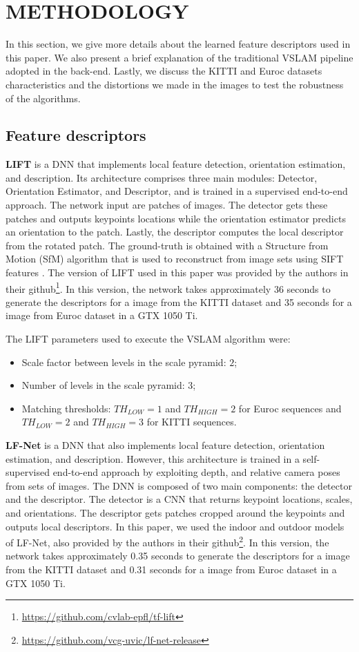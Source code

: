 \documentclass[a4paper, 10pt, conference]{ieeeconf}      %
\begin{document}
\section{METHODOLOGY}
In this section, we give more details about the learned feature descriptors used in this paper. We also present a brief explanation of the traditional VSLAM pipeline adopted in the back-end. Lastly, we discuss the KITTI and Euroc datasets characteristics and the distortions we made in the images to test the robustness of the algorithms. 

\subsection{Feature descriptors}
\textbf{LIFT} \cite{lift} is a DNN that implements local feature detection, orientation estimation, and description. Its architecture comprises three main modules: Detector, Orientation Estimator, and Descriptor, and is trained in a supervised end-to-end approach. The network input are patches of images. The detector gets these patches and outputs keypoints locations while the orientation estimator predicts an orientation to the patch. Lastly, the descriptor computes the local descriptor from the rotated patch. The ground-truth is obtained with a Structure from Motion (SfM) algorithm that is used to reconstruct from image sets using SIFT features \cite{sift}. The version of LIFT used in this paper was provided by the authors in their github\footnote{\url{https://github.com/cvlab-epfl/tf-lift}}. In this version, the network takes approximately 36 seconds to generate the descriptors for a image from the KITTI dataset and 35 seconds for a image from Euroc dataset in a GTX 1050 Ti.

The LIFT parameters used to execute the VSLAM algorithm were: 
\begin{itemize}
    \item Scale factor between levels in the scale pyramid: $2$;
    \item Number of levels in the scale pyramid: $3$;
    \item Matching thresholds: $TH_{LOW} = 1$ and $TH_{HIGH} = 2$ for Euroc sequences and $TH_{LOW} = 2$ and $TH_{HIGH} = 3$ for KITTI sequences.
\end{itemize}


\textbf{LF-Net} \cite{lf-net} is a DNN that also implements local feature detection, orientation estimation, and description. However, this architecture is trained in a self-supervised end-to-end approach by exploiting depth, and relative camera poses from sets of images. The DNN is composed of two main components: the detector and the descriptor. The detector is a CNN that returns keypoint locations, scales, and orientations. The descriptor gets patches cropped around the keypoints and outputs local descriptors. In this paper, we used the indoor and outdoor models of LF-Net, also provided by the authors in their github\footnote{\url{https://github.com/vcg-uvic/lf-net-release}}. In this version, the network takes approximately 0.35 seconds to generate the descriptors for a image from the KITTI dataset and 0.31 seconds for a image from Euroc dataset in a GTX 1050 Ti.
\end{document}
